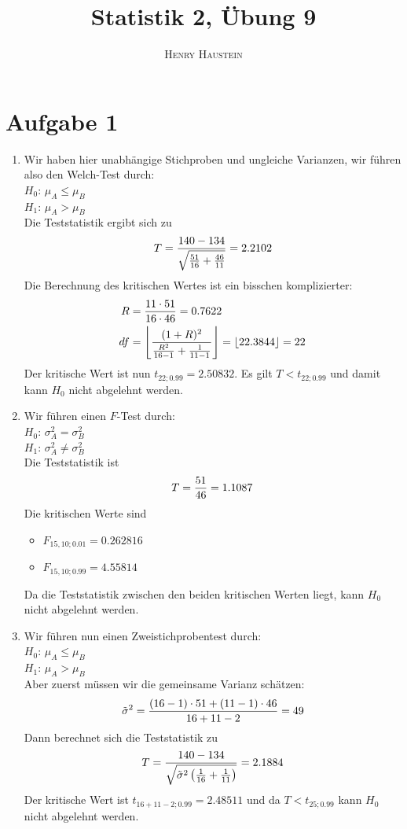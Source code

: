 \documentclass{article}
\title{\textbf{Statistik 2, Übung 9}}
\author{\textsc{Henry Haustein}}
\date{}
\begin{document}
	\maketitle
	
	\section*{Aufgabe 1}
	\begin{enumerate}[label=(\alph*)]
		\item Wir haben hier unabhängige Stichproben und ungleiche Varianzen, wir führen also den Welch-Test durch: \\
		$H_0$: $\mu_A \le \mu_B$ \\
		$H_1$: $\mu_A > \mu_B$ \\
		Die Teststatistik ergibt sich zu
		\begin{align}
			T = \frac{140-134}{\sqrt{\frac{51}{16} + \frac{46}{11}}} = 2.2102 \notag
		\end{align}
		Die Berechnung des kritischen Wertes ist ein bisschen komplizierter:
		\begin{align}
			R &= \frac{11\cdot 51}{16\cdot 46} = 0.7622 \notag \\
			df &= \left\lfloor\frac{(1+R)^2}{\frac{R^2}{16-1} + \frac{1}{11-1}}\right\rfloor = \lfloor 22.3844\rfloor = 22 \notag
		\end{align}
		Der kritische Wert ist nun $t_{22;0.99}=2.50832$. Es gilt $T<t_{22;0.99}$ und damit kann $H_0$ nicht abgelehnt werden.
		\item Wir führen einen $F$-Test durch: \\
		$H_0$: $\sigma_A^2 = \sigma_B^2$ \\
		$H_1$: $\sigma_A^2 \neq \sigma_B^2$ \\
		Die Teststatistik ist
		\begin{align}
			T = \frac{51}{46} = 1.1087 \notag
		\end{align}
		Die kritischen Werte sind
		\begin{itemize}
			\item $F_{15,10;0.01}=0.262816$
			\item $F_{15,10;0.99}=4.55814$
		\end{itemize}
		Da die Teststatistik zwischen den beiden kritischen Werten liegt, kann $H_0$ nicht abgelehnt werden.
		\item Wir führen nun einen Zweistichprobentest durch: \\
		$H_0$: $\mu_A \le \mu_B$ \\
		$H_1$: $\mu_A > \mu_B$ \\
		Aber zuerst müssen wir die gemeinsame Varianz schätzen:
		\begin{align}
			\tilde{\sigma}^2 = \frac{(16-1)\cdot 51 + (11-1)\cdot 46}{16+11-2} = 49 \notag
		\end{align}
		Dann berechnet sich die Teststatistik zu
		\begin{align}
			T = \frac{140-134}{\sqrt{\tilde{\sigma}^2\left(\frac{1}{16}+\frac{1}{11}\right)}} = 2.1884 \notag
		\end{align}
		Der kritische Wert ist $t_{16+11-2;0.99}=2.48511$ und da $T < t_{25;0.99}$ kann $H_0$ nicht abgelehnt werden.
 	\end{enumerate}
	
\end{document}
